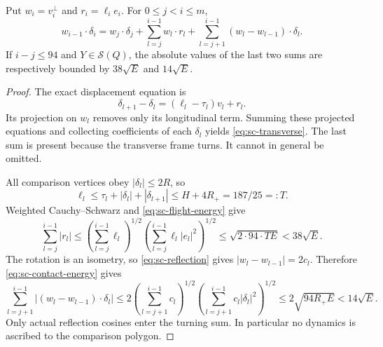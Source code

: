 \begin{sclemma}\label{lem:sc-telescoping}
Put $w_i=v_i^\perp$ and $r_i=\ell_i e_i$. For $0\le j<i\le m$,
\begin{equation}\label{eq:sc-transverse}
 w_{i-1}\cdot\delta_i=w_j\cdot\delta_j+
 \sum_{l=j}^{i-1}w_l\cdot r_l+
 \sum_{l=j+1}^{i-1}(w_l-w_{l-1})\cdot\delta_l.
\end{equation}
If $i-j\le94$ and $Y\in\mathcal S(Q)$, the absolute values of the last two sums are respectively bounded by $38\sqrt E$ and $14\sqrt E$.
\end{sclemma}
\begin{proof}
The exact displacement equation is
\[
 \delta_{l+1}-\delta_l=(\ell_l-\tau_l)v_l+r_l.
\]
Its projection on $w_l$ removes only its longitudinal term. Summing these projected equations and collecting coefficients of each $\delta_l$ yields \eqref{eq:sc-transverse}. The last sum is present because the transverse frame turns. It cannot in general be omitted.

All comparison vertices obey $|\delta_l|\le2R$, so
\[
 \ell_l\le\tau_l+|\delta_l|+|\delta_{l+1}|
 \le H+4R_+=187/25=:T.
\]
Weighted Cauchy--Schwarz and \eqref{eq:sc-flight-energy} give
\[
 \sum_{l=j}^{i-1}|r_l|\le
 \left(\sum_{l=j}^{i-1}\ell_l\right)^{1/2}
 \left(\sum_{l=j}^{i-1}\ell_l|e_l|^2\right)^{1/2}
 \le\sqrt{2\cdot94\cdot T E}<38\sqrt E.
\]
The rotation is an isometry, so \eqref{eq:sc-reflection} gives $|w_l-w_{l-1}|=2c_l$. Therefore \eqref{eq:sc-contact-energy} gives
\[
 \sum_{l=j+1}^{i-1}|(w_l-w_{l-1})\cdot\delta_l|
 \le2\left(\sum_{l=j+1}^{i-1}c_l\right)^{1/2}
          \left(\sum_{l=j+1}^{i-1}c_l|\delta_l|^2\right)^{1/2}
 \le2\sqrt{94R_+E}<14\sqrt E.
\]
Only actual reflection cosines enter the turning sum. In particular no dynamics is ascribed to the comparison polygon.
\end{proof}

